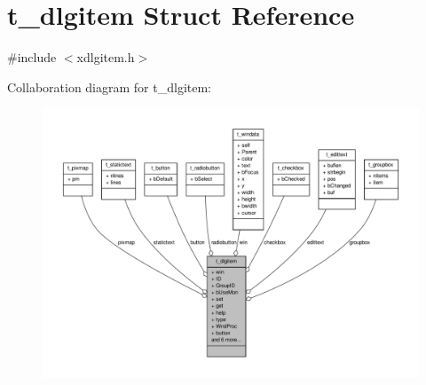 \hypertarget{structt__dlgitem}{\section{t\-\_\-dlgitem \-Struct \-Reference}
\label{structt__dlgitem}
}


{\ttfamily \#include $<$xdlgitem.\-h$>$}



\-Collaboration diagram for t\-\_\-dlgitem\-:
\nopagebreak
\begin{figure}[H]
\begin{center}
\leavevmode
\includegraphics[width=350pt]{structt__dlgitem__coll__graph}
\end{center}
\end{figure}
